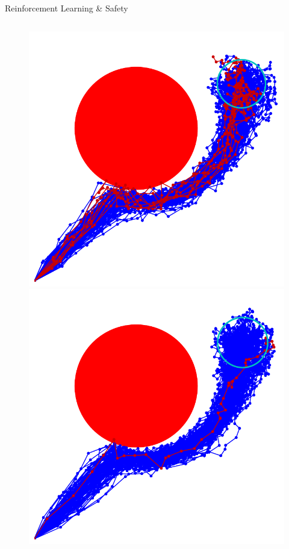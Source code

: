 \documentclass[lecture]{beamer}
\begin{document}
\begin{frame}{\normalsize Reinforcement Learning \& Safety}
\begin{columns}
\begin{overlayarea}{\textwidth}{.55\textheight}
\begin{figure}
{	}
	      \only<19>
        {
        \center
	\includegraphics[width=1\textwidth,clip]{Codes/RL/RLSafety16.pdf}
	}
	      \only<20>
        {
        \center
	\includegraphics[width=1\textwidth,clip]{Codes/RL/RLSafety17.pdf}
}
\end{figure}
\end{overlayarea}
\end{columns}
\end{frame}
\end{document}
